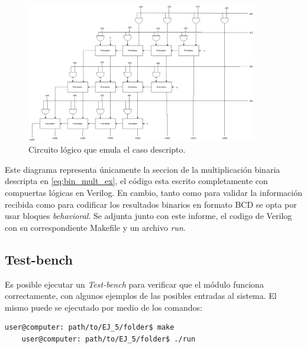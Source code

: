 \begin{figure}[H]
    \centering
        \includegraphics[width=0.9\textwidth]{./EJ_5/circuito_con_FA.png}
        \caption{\label{fig:circuito_con_FA}Circuito l\'ogico que emula el caso descripto.}        
\end{figure}

Este diagrama representa \'unicamente la seccion de la multiplicaci\'on binaria descripta en \ref{eq:bin_mult_ex}, el c\'odigo esta escrito completamente con compuertas l\'ogicas en Verilog.
En cambio, tanto como para validar la informaci\'on recibida como para codificar los resultados binarios en formato BCD se opta por usar bloques \textit{behavioral}.
Se adjunta junto con este informe, el codigo de Verilog con su correspondiente Makefile y un archivo \textit{run}.

\subsection{Test-bench}
Es posible ejecutar un \textit{Test-bench} para verificar que el m\'odulo funciona correctamente, con algunos ejemplos de las posibles entradas al sistema. 
El mismo puede se ejecutado por medio de los comandos:
\begin{lstlisting}[language=bash]
    user@computer: path/to/EJ_5/folder$ make
    user@computer: path/to/EJ_5/folder$ ./run
\end{lstlisting}
